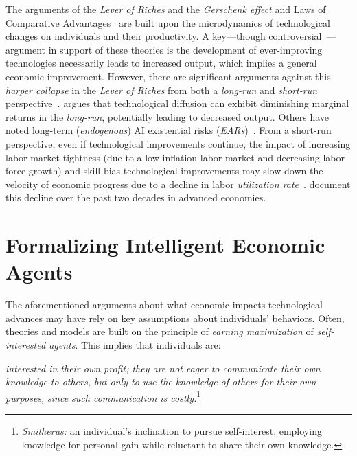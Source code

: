 {The arguments of the \emph{Lever of Riches} and the \emph{Gerschenk effect} and Laws of Comparative Advantages~\citep{smith2002inquiry} are built upon the microdynamics of technological changes on individuals and their productivity.
A key---though controversial~\citep{landymore2023sam, finance2024ai}---{argument} in support of these theories is  the development of ever-improving technologies necessarily leads to increased output, which implies a general economic improvement.
However, there are significant arguments against this \emph{harper collapse} in the \emph{Lever of Riches} from both a \emph{long-run} and \emph{short-run} perspective~\citep{acemoglu2023power, swoboda2025examining}.
\citet{acemoglu2023power} argues that technological diffusion can exhibit diminishing marginal returns in the \emph{long-run}, potentially leading to decreased output.
Others have noted long-term (\emph{endogenous}) AI existential risks (\emph{EARs})~\citep{bender2021dangers, boiko2023emergent, lu2024ai, Kulveit2025GradualDS, hendrycks2023overview}.
From a short-run perspective, even if technological improvements continue, the impact of increasing labor market tightness (due to a low inflation labor market and decreasing labor force growth) and skill bias technological improvements may slow down the velocity of economic progress due to a decline in labor \emph{utilization rate}~\citep{acemoglu2012why}.
\citet{acemoglu2012why} document this decline over the past two decades in advanced economies.


\section{Formalizing Intelligent Economic Agents}

\label{RfC}

The aforementioned arguments about what economic impacts technological advances may have rely on key assumptions about individuals' behaviors.
Often, theories and models are built on the principle of \emph{earning maximization} of \emph{self-interested agents}.
This implies that individuals are:
\begin{myquotation}
    \emph{interested in their own profit; they are not eager to communicate their own knowledge to others, but only to use the knowledge of others for their own purposes,} \emph{since such communication is costly.}\footnote{\citet{smith2002inquiry}\emph{Smitherus:} an individual's inclination to pursue self-interest, employing knowledge for personal gain while reluctant to share their own knowledge.}
\end{myquotation}

}
